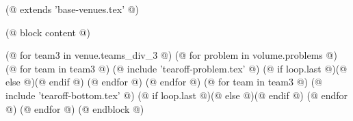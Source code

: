 (@ extends 'base-venues.tex' @)

(@ block content @)
    \pagestyle{tearoff}

    (@ for team3 in venue.teams_div_3 @)
        (@ for problem in volume.problems @)
            (@ for team in team3 @)%
                (@ include 'tearoff-problem.tex' @)
                (@ if loop.last @)\newpage(@ else @)\vspace*{-1mm}(@ endif @)
            (@ endfor @)
        (@ endfor @)
        (@ for team in team3 @)%
            (@ include 'tearoff-bottom.tex' @)
            (@ if loop.last @)\newpage(@ else @)\vspace*{-1mm}(@ endif @)
        (@ endfor @)
    (@ endfor @)
(@ endblock @)
